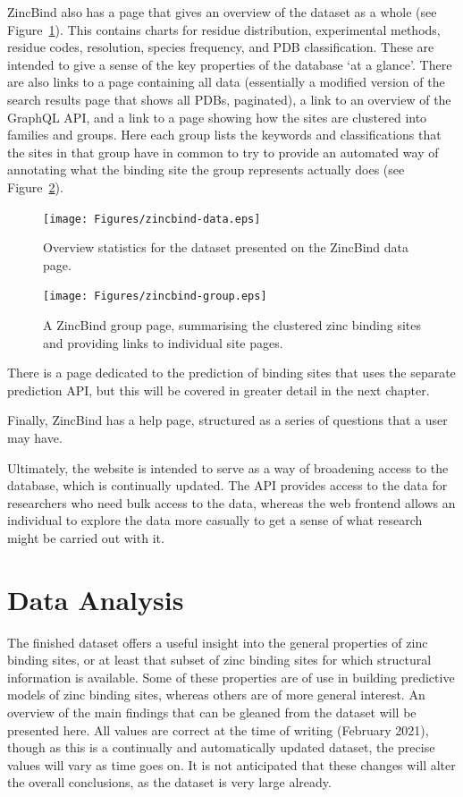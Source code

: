 ZincBind also has a page that gives an overview of the dataset as a whole (see Figure~\ref{fig:zincbind-data}). This contains charts for residue distribution, experimental methods, residue codes, resolution, species frequency, and PDB classification. These are intended to give a sense of the key properties of the database `at a glance'. There are also links to a page containing all data (essentially a modified version of the search results page that shows all PDBs, paginated), a link to an overview of the GraphQL API, and a link to a page showing how the sites are clustered into families and groups. Here each group lists the keywords and classifications that the sites in that group have in common to try to provide an automated way of annotating what the binding site the group represents actually does (see Figure~\ref{fig:zincbind-group}).

\begin{figure}
\centering
\texttt{[image: Figures/zincbind-data.eps]}
\caption{\label{fig:zincbind-data} Overview statistics for the dataset presented on
the ZincBind data page.}
\end{figure}

\begin{figure}
\centering
\texttt{[image: Figures/zincbind-group.eps]}
\caption{\label{fig:zincbind-group} A ZincBind group page, summarising the clustered zinc
binding sites and providing links to individual site pages.}
\end{figure}

There is a page dedicated to the prediction of binding sites that uses the separate prediction API, but this will be covered in greater detail in the next chapter.

Finally, ZincBind has a help page, structured as a series of questions that a user may have.

Ultimately, the website is intended to serve as a way of broadening access to the database, which is continually updated. The API provides access to the data for researchers who need bulk access to the data, whereas the web frontend allows an individual to explore the data more casually to get a sense of what research might be carried out with it.

\section{Data Analysis}

The finished dataset offers a useful insight into the general properties of zinc binding sites, or at least that subset of zinc binding sites for which structural information is available. Some of these properties are of use in building predictive models of zinc binding sites, whereas others are of more general interest. An overview of the main findings that can be gleaned from the dataset will be presented here. All values are correct at the time of writing (February 2021), though as this is a continually and automatically updated dataset, the precise values will vary as time goes on. It is not anticipated that these changes will alter the overall conclusions, as the dataset is very large already.

